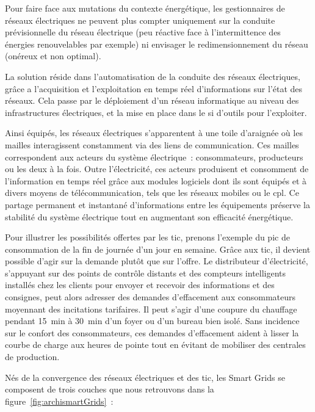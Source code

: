 Pour faire face aux mutations du contexte énergétique, les gestionnaires de 
réseaux électriques ne peuvent plus compter uniquement sur la conduite 
prévisionnelle du réseau électrique (peu réactive face à l'intermittence des 
énergies renouvelables par exemple) ni envisager le redimensionnement du réseau 
(onéreux et non optimal). 

La solution réside dans l'automatisation de la conduite des réseaux électriques, 
grâce a l'acquisition et l'exploitation en temps réel d'informations sur l'état 
des réseaux. Cela passe par le déploiement d'un réseau informatique au niveau 
des infrastructures électriques, et la mise en place dans le \gls{si} d'outils 
pour l'exploiter.

Ainsi équipés, les réseaux électriques s'apparentent à une toile d'araignée où 
les mailles interagissent constamment via des liens de communication. Ces 
mailles correspondent aux acteurs du système électrique~: consommateurs, 
producteurs ou les deux à la fois. Outre l'électricité, ces acteurs produisent 
et consomment de l'information en temps réel grâce aux modules logiciels dont 
ils sont équipés et à divers moyens de télécommunication, tels que les réseaux 
mobiles ou le \gls{cpl}. Ce partage permanent et 
instantané d'informations entre les équipements préserve la stabilité du 
système électrique tout en augmentant son efficacité énergétique.

Pour illustrer les possibilités offertes par les \gls{tic}, prenons l'exemple 
du pic de consommation de la fin de journée d'un jour en semaine. Grâce aux 
\gls{tic}, il devient possible d'agir sur la demande plutôt que sur l'offre. Le
distributeur d'électricité, s'appuyant sur des points de contrôle distants et 
des compteurs intelligents installés chez les clients pour envoyer et recevoir 
des informations et des consignes, peut alors adresser des demandes 
d'effacement aux consommateurs moyennant des incitations tarifaires. Il peut 
s'agir d'une coupure du chauffage pendant 15~min à 30~min d'un foyer ou d'un 
bureau bien isolé. Sans incidence sur le confort des consommateurs, ces 
demandes d'effacement aident à lisser la courbe de charge aux heures de pointe 
tout en évitant de mobiliser des centrales de production. 

Nés de la convergence des réseaux électriques et des \gls{tic}, les Smart Grids 
se composent de trois couches que nous retrouvons dans la figure~\ref{fig:archismartGrids}~:

